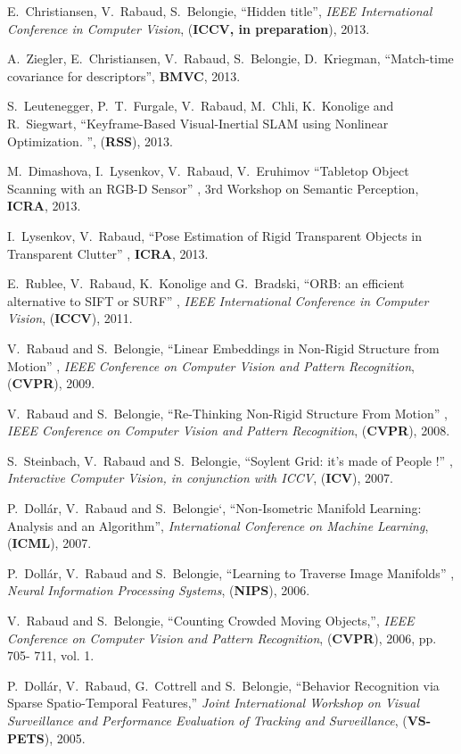 E.~Christiansen, V.~Rabaud, S.~Belongie, ``Hidden title'', {\em IEEE 
International Conference in Computer Vision}, (\textbf{ICCV, in preparation}), 2013.

A.~Ziegler, E.~Christiansen, V.~Rabaud, S.~Belongie, D.~Kriegman, ``Match-time covariance for 
descriptors'', \textbf{BMVC}, 2013.

S.~Leutenegger, P.~T.~Furgale, V.~Rabaud, M.~Chli, K.~Konolige and R.~Siegwart, ``Keyframe-Based Visual-Inertial SLAM using Nonlinear Optimization.
'', (\textbf{RSS}), 2013.

M.~Dimashova, I.~Lysenkov, V.~Rabaud, V.~Eruhimov ``Tabletop Object Scanning with an RGB-D Sensor'' , 3rd Workshop 
on Semantic Perception, \textbf{ICRA}, 2013.

I.~Lysenkov, V.~Rabaud, ``Pose Estimation of Rigid Transparent Objects in Transparent Clutter'' , \textbf{ICRA}, 2013.

E.~Rublee, V.~Rabaud, K.~Konolige and G.~Bradski, ``ORB: an efficient alternative to SIFT or SURF'' , {\em IEEE 
International Conference in Computer Vision}, (\textbf{ICCV}), 2011.

V.~Rabaud and S.~Belongie, ``Linear Embeddings in Non-Rigid Structure from Motion'' , {\em IEEE Conference on Computer 
Vision and Pattern Recognition}, (\textbf{CVPR}), 2009.

V.~Rabaud and S.~Belongie, ``Re-Thinking Non-Rigid Structure From Motion'' , {\em IEEE Conference on Computer Vision and 
Pattern Recognition}, (\textbf{CVPR}), 2008.

S.~Steinbach, V.~Rabaud and S.~Belongie, ``Soylent Grid: it's made of People !'' , {\em Interactive Computer Vision, in 
conjunction with ICCV}, (\textbf{ICV}), 2007.

P.~Doll\'ar, V.~Rabaud and S.~Belongie`, ``Non-Isometric Manifold Learning: Analysis and an Algorithm'', {\em 
International Conference on Machine Learning}, (\textbf{ICML}), 2007.

P.~Doll\'ar, V.~Rabaud and S.~Belongie, ``Learning to Traverse Image Manifolds'' , {\em Neural Information Processing 
Systems}, (\textbf{NIPS}), 2006. 

V.~Rabaud and S.~Belongie, ``Counting Crowded Moving Objects,'', {\em IEEE Conference on Computer Vision and Pattern 
Recognition}, (\textbf{CVPR}), 2006, pp. 705- 711, vol. 1.

P.~Doll\'ar, V.~Rabaud, G.~Cottrell and S.~Belongie, ``Behavior Recognition via Sparse Spatio-Temporal Features,'' {\em 
Joint International Workshop on Visual Surveillance and Performance Evaluation of Tracking and Surveillance}, 
(\textbf{VS-PETS}), 2005. 


